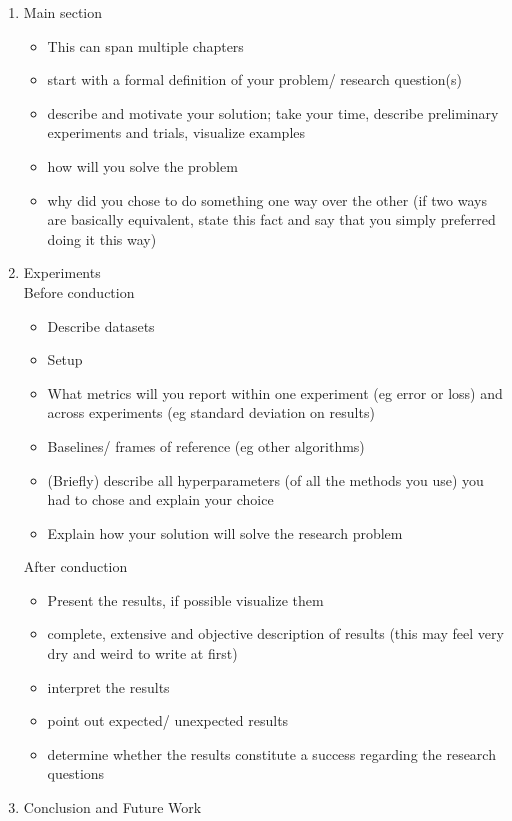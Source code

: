 \documentclass[nodate]{proc}
\begin{document}
\begin{enumerate}
\begin{itemize}
		\end{itemize}
	\item Main section
		\begin{itemize}
			\item This can span multiple chapters
			\item start with a formal definition of your problem/ research question(s)
			\item describe and motivate your solution; take your time, describe preliminary experiments and trials, visualize examples
			\item how will you solve the problem
			\item why did you chose to do something one way over the other (if two ways are basically equivalent, state this fact and say that you simply preferred doing it this way)
		\end{itemize}
	\item Experiments\\
		Before conduction
		\begin{itemize}
			\item Describe datasets
			\item Setup
			\item What metrics will you report within one experiment (eg error or loss) and across experiments (eg standard deviation on results)
			\item Baselines/ frames of reference (eg other algorithms)
			\item (Briefly) describe all hyperparameters (of all the methods you use) you had to chose and explain your choice
			\item Explain how your solution will solve the research problem
		\end{itemize} 
		After conduction
		\begin{itemize}
			\item Present the results, if possible visualize them
			\item complete, extensive and objective description of results (this may feel very dry and weird to write at first)
			\item interpret the results
			\item point out expected/ unexpected results
			\item determine whether the results constitute a success regarding the research questions
		\end{itemize}
	\item Conclusion and Future Work
		\begin{itemize}

\end{itemize}
\end{enumerate}
\end{document}
